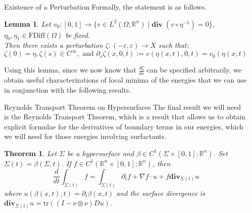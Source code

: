 \documentclass[final,noamsthm]{beamer}
\newtheorem{thm}{Theorem}
\newtheorem{lemma}{Lemma}
\newcommand{\R}{\mathbb{R}}
\renewcommand{\div}{\mathbf{div}}
\newcommand{\FDiff}{\text{FDiff}}
\def\p{\partial}
\def\ep{\varepsilon}
\def\st{\;\vert\;}
\newlength{\sepwidth}
\newlength{\colwidth}
\newcommand{\separatorcolumn}{\begin{column}{\sepwidth}\end{column}}
\begin{document}
\begin{frame}[t]
\begin{columns}[t]
\begin{column}{\colwidth}
\begin{block}{Existence of a Perturbation}
                Formally, the statement is as follows.
                \begin{lemma}
                    Let $v_0:[0,1]\to \{v\in L^2(\Omega; \R^n) \st \div\;(v\circ\eta^{-1})=0\}$, $\eta_0,\eta_1\in \FDiff(\Omega)$ be fixed.\\
                    Then there exists a perturbation $ \zeta: (-\ep, \ep) \to X$ such that:
                    \[
                        \zeta(0)=\eta ,\zeta(s)\in C^\infty, \text{ and }
                        \p_s \zeta(x,0,t):=v(\eta(x,t),0,t)=v_0(\eta(x,t),t)
                    \]
                \end{lemma}
                Using this lemma, since we now know that $\frac{d\zeta}{ds}$ can be specified arbitrarily, we obtain useful characterizations of local minima of the energies that we can use in conjunction with the following results.
            \end{block}



            \begin{block}{Reynolds Transport Theorem on Hypersurfaces}
                The final result we will need is the Reynolds Transport Theorem, which is a result that allows us to obtain explicit formulae for the derivatives of boundary terms in our energies, which we will need for those energies involving surfactants.
                \begin{thm}
                    Let $\Sigma$ be a hypersurface and $\beta\in C^1(\Sigma\times [0,1]; \R^n)$. Set $\Sigma(t)=\beta(\Sigma,t)$. If $f\in C^1(\R^n\times [0,1];\R^n)$, then
                    \begin{equation}
                        \dfrac{d}{dt}\int_{\Sigma(t)}f=\int_{\Sigma(t)}\p_t f+\nabla f\cdot u+f\div_{\Sigma(t)}u
                    \end{equation}
                    where $u(\beta(x,t),t)=\p_t\beta(x,t)$ and the surface divergence is
                    $
                    \div_{\Sigma(t)}u=\text{tr}((I-\nu\otimes\nu)Du).
                    $
                \end{thm}
            \end{block}


        \end{column}



        \separatorcolumn


\end{columns}
\end{frame}
\end{document}
